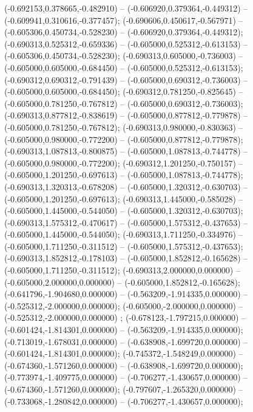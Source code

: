  (-0.692153,0.378665,-0.482910) -- (-0.606920,0.379364,-0.449312) -- (-0.609941,0.310616,-0.377457);
 (-0.690606,0.450617,-0.567971) -- (-0.605306,0.450734,-0.528230) -- (-0.606920,0.379364,-0.449312);
 (-0.690313,0.525312,-0.659336) -- (-0.605000,0.525312,-0.613153) -- (-0.605306,0.450734,-0.528230);
 (-0.690313,0.605000,-0.736003) -- (-0.605000,0.605000,-0.684450) -- (-0.605000,0.525312,-0.613153);
 (-0.690312,0.690312,-0.791439) -- (-0.605000,0.690312,-0.736003) -- (-0.605000,0.605000,-0.684450);
 (-0.690312,0.781250,-0.825645) -- (-0.605000,0.781250,-0.767812) -- (-0.605000,0.690312,-0.736003);
 (-0.690313,0.877812,-0.838619) -- (-0.605000,0.877812,-0.779878) -- (-0.605000,0.781250,-0.767812);
 (-0.690313,0.980000,-0.830363) -- (-0.605000,0.980000,-0.772200) -- (-0.605000,0.877812,-0.779878);
 (-0.690313,1.087813,-0.800875) -- (-0.605000,1.087813,-0.744778) -- (-0.605000,0.980000,-0.772200);
 (-0.690312,1.201250,-0.750157) -- (-0.605000,1.201250,-0.697613) -- (-0.605000,1.087813,-0.744778);
 (-0.690313,1.320313,-0.678208) -- (-0.605000,1.320312,-0.630703) -- (-0.605000,1.201250,-0.697613);
 (-0.690313,1.445000,-0.585028) -- (-0.605000,1.445000,-0.544050) -- (-0.605000,1.320312,-0.630703);
 (-0.690313,1.575312,-0.470617) -- (-0.605000,1.575312,-0.437653) -- (-0.605000,1.445000,-0.544050);
 (-0.690313,1.711250,-0.334976) -- (-0.605000,1.711250,-0.311512) -- (-0.605000,1.575312,-0.437653);
 (-0.690313,1.852812,-0.178103) -- (-0.605000,1.852812,-0.165628) -- (-0.605000,1.711250,-0.311512);
 (-0.690313,2.000000,0.000000) -- (-0.605000,2.000000,0.000000) -- (-0.605000,1.852812,-0.165628);
 (-0.641796,-1.904680,0.000000) -- (-0.563209,-1.914335,0.000000) -- (-0.525312,-2.000000,0.000000);
 (-0.605000,-2.000000,0.000000) -- (-0.525312,-2.000000,0.000000) ;
 (-0.678123,-1.797215,0.000000) -- (-0.601424,-1.814301,0.000000) -- (-0.563209,-1.914335,0.000000);
 (-0.713019,-1.678031,0.000000) -- (-0.638908,-1.699720,0.000000) -- (-0.601424,-1.814301,0.000000);
 (-0.745372,-1.548249,0.000000) -- (-0.674360,-1.571260,0.000000) -- (-0.638908,-1.699720,0.000000);
 (-0.773974,-1.409775,0.000000) -- (-0.706277,-1.430657,0.000000) -- (-0.674360,-1.571260,0.000000);
 (-0.797607,-1.265320,0.000000) -- (-0.733068,-1.280842,0.000000) -- (-0.706277,-1.430657,0.000000);
